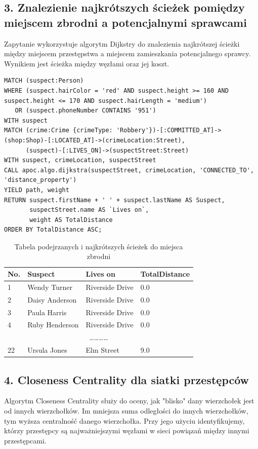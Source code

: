 \documentclass[a4paper,12pt]{article}
\begin{document}
\subsection*{3. Znalezienie najkrótszych ścieżek pomiędzy miejscem zbrodni a potencjalnymi sprawcami}
Zapytanie wykorzystuje algorytm Dijkstry do znalezienia najkrótszej ścieżki między miejscem przestępstwa a miejscem zamieszkania potencjalnego sprawcy. Wynikiem jest ścieżka między węzłami oraz jej koszt.
\begin{verbatim}
MATCH (suspect:Person)
WHERE (suspect.hairColor = 'red' AND suspect.height >= 160 AND suspect.height <= 170 AND suspect.hairLength = 'medium')
   OR (suspect.phoneNumber CONTAINS '951')
WITH suspect
MATCH (crime:Crime {crimeType: 'Robbery'})-[:COMMITTED_AT]->(shop:Shop)-[:LOCATED_AT]->(crimeLocation:Street),
      (suspect)-[:LIVES_ON]->(suspectStreet:Street)
WITH suspect, crimeLocation, suspectStreet
CALL apoc.algo.dijkstra(suspectStreet, crimeLocation, 'CONNECTED_TO', 'distance_property') 
YIELD path, weight
RETURN suspect.firstName + ' ' + suspect.lastName AS Suspect,
       suspectStreet.name AS `Lives on`,
       weight AS TotalDistance
ORDER BY TotalDistance ASC;
\end{verbatim}

\begin{table}[h!]
\centering
\begin{tabular}{|l|l|l|l|}
\hline
\textbf{No.} & \textbf{Suspect}       & \textbf{Lives on}       & \textbf{TotalDistance} \\ \hline
1           & Wendy Turner           & Riverside Drive          & 0.0                   \\ \hline
2           & Daisy Anderson         & Riverside Drive          & 0.0                   \\ \hline
3           & Paula Harris           & Riverside Drive          & 0.0                   \\ \hline
4           & Ruby Henderson         & Riverside Drive          & 0.0                   \\ \hline
\multicolumn{4}{|c|}{\dots\dots\dots\dots} \\ \hline
22          & Ursula Jones           & Elm Street               & 9.0                   \\ \hline
\end{tabular}
\caption{Tabela podejrzanych i najkrótszych ścieżek do miejsca zbrodni}
\end{table}

\subsection*{4. Closeness Centrality dla siatki przestępców}
Algorytm Closeness Centrality służy do oceny, jak "blisko" dany wierzchołek jest od innych wierzchołków. Im mniejsza suma odległości do innych wierzchołków, tym wyższa centralność danego wierzchołka.
Przy jego użyciu identyfikujemy, którzy przestępcy są najważniejszymi węzłami w sieci powiązań między innymi przestępcami.
\end{document}
